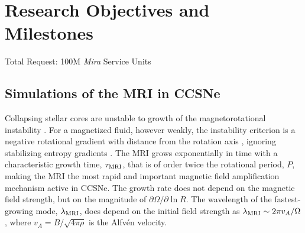\section{Research Objectives and Milestones}
\label{sec:objectives}



\vspace{0.1in}  Total Request: 100M {\it Mira} Service Units \vspace{-0.1in}

\subsection{Simulations of the MRI in CCSNe}
\label{sec:mriSim}

Collapsing stellar cores are unstable to growth of the magnetorotational instability \citep{Akiyama:2003jc}. 
For a magnetized fluid, however weakly, the instability criterion is a negative rotational gradient with distance from the rotation axis \citep{Balbus:1991fi}, ignoring stabilizing entropy gradients \citep{Obergaulinger:2009fv}. 
The MRI grows exponentially in time with a characteristic growth time, $\tau_{\rm MRI}$, that is of order twice the rotational period, $P$, making the MRI the most rapid and important magnetic field amplification mechanism active in CCSNe. 
The growth rate does not depend on the magnetic field strength, but on the magnitude of $\partial \Omega / \partial \ln R$. 
The wavelength of the fastest-growing mode, $\lambda_{\rm MRI}$, does depend on the initial field strength as $\lambda_{\rm MRI} \sim 2\pi v_A / \Omega$, where $v_A = B/\sqrt{4\pi \rho}$ is the Alfv\'en velocity.

